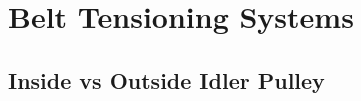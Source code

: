 \section{Belt Tensioning Systems\label{sec:literatureReview:beltTension}}

\subsection{Inside vs Outside Idler Pulley\label{sec:literatureReview:beltTension:idler}}

